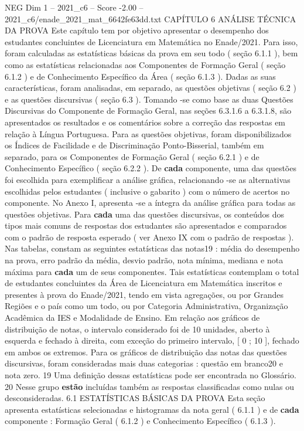 \begin{textsample}{NEG Dim 1 – 2021\_c6 – Score -2.00 – 2021\_c6/enade\_2021\_mat\_6642fe63dd.txt}  \label{ex:f1_neg_237}
CAPÍTULO 6 ANÁLISE TÉCNICA DA PROVA Este capítulo tem por objetivo apresentar o desempenho dos estudantes concluintes de Licenciatura em Matemática no Enade/2021.
Para isso, foram calculadas as estatísticas básicas da prova em seu todo ( seção 6.1.1 ), bem como as estatísticas relacionadas aos Componentes de Formação Geral ( seção 6.1.2 ) e de Conhecimento Específico da Área ( seção 6.1.3 ).
Dadas as suas características, foram analisadas, em separado, as questões objetivas ( seção 6.2 ) e as questões discursivas ( seção 6.3 ).
Tomando -se como base as duas Questões Discursivas do Componente de Formação Geral, nas seções 6.3.1.6 a 6.3.1.8, são apresentados os resultados e os comentários sobre a correção das respostas em relação à Língua Portuguesa.
Para as questões objetivas, foram disponibilizados os Índices de Facilidade e de Discriminação Ponto-Bisserial, também em separado, para os Componentes de Formação Geral ( seção 6.2.1 ) e de Conhecimento Específico ( seção 6.2.2 ).
De \textbf{cada} componente, uma das questões foi escolhida para exemplificar a análise gráfica, relacionando -se as alternativas escolhidas pelos estudantes ( inclusive o gabarito ) com o número de acertos no componente.
No Anexo I, apresenta -se a íntegra da análise gráfica para todas as questões objetivas.
Para \textbf{cada} uma das questões discursivas, os conteúdos dos tipos mais comuns de respostas dos estudantes são apresentados e comparados com o padrão de resposta esperado ( ver Anexo IX com o padrão de respostas ).
Nas tabelas, constam as seguintes estatísticas das notas19 : média do desempenho na prova, erro padrão da média, desvio padrão, nota mínima, mediana e nota máxima para \textbf{cada} um de seus componentes.
Tais estatísticas contemplam o total de estudantes concluintes da Área de Licenciatura em Matemática inscritos e presentes à prova do Enade/2021, tendo em vista agregações, ou por Grandes Regiões e o país como um todo, ou por Categoria Administrativa, Organização Acadêmica da IES e Modalidade de Ensino.
Em relação aos gráficos de distribuição de notas, o intervalo considerado foi de 10 unidades, aberto à esquerda e fechado à direita, com exceção do primeiro intervalo, [ 0 ; 10 ], fechado em ambos os extremos.
Para os gráficos de distribuição das notas das questões discursivas, foram consideradas mais duas categorias : questão em branco20 e nota zero. 19 Uma definição dessas estatísticas pode ser encontrada no Glossário. 20 Nesse grupo \textbf{estão} incluídas também as respostas classificadas como nulas ou desconsideradas. 6.1 ESTATÍSTICAS BÁSICAS DA PROVA Esta seção apresenta estatísticas selecionadas e histogramas da nota geral ( 6.1.1 ) e de \textbf{cada} componente : Formação Geral ( 6.1.2 ) e Conhecimento Específico ( 6.1.3 ).

\end{textsample}
